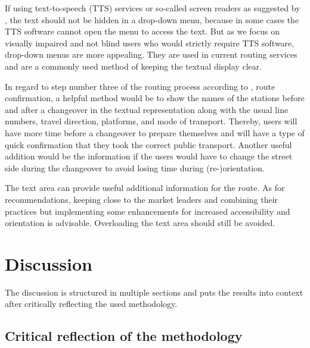\documentclass[agile, final]{copernicus-agile}
\begin{document}
If using text-to-speech (TTS) services or so-called screen readers as suggested by \citet{NeuschmidEA2012}, the text should not be hidden in a drop-down menu, because in some cases the TTS software cannot open the menu to access the text. But as we focus on visually impaired and not blind users who would strictly require TTS software, drop-down menus are more appealing. They are used in current routing services and are a commonly used method of keeping the textual display clear.

In regard to step number three of the routing process according to \citet{Delikostidis2011}, route confirmation, a helpful method would be to show the names of the stations before and after a changeover in the textual representation along with the usual line numbers, travel direction, platforms, and mode of transport. Thereby, users will have more time before a changeover to prepare themselves and will have a type of quick confirmation that they took the correct public transport. Another useful addition would be the information if the users would have to change the street side during the changeover to avoid losing time during (re-)orientation.

The text area can provide useful additional information for the route. As for recommendations, keeping close to the market leaders and combining their practices but implementing some enhancements for increased accessibility and orientation is advisable. Overloading the text area should still be avoided. 


\section{Discussion}

The discussion is structured in multiple sections and puts the results into context after critically reflecting the used methodology. 

\subsection{Critical reflection of the methodology}
\end{document}
